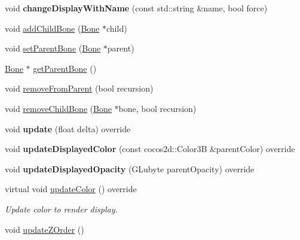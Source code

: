 \begin{DoxyCompactItemize}
void {\bfseries change\+Display\+With\+Name} (const std\+::string \&name, bool force)
\item 
void \hyperlink{classcocostudio_1_1Bone_a0e2a59584601241d1f0cfbe5c3e240ca}{add\+Child\+Bone} (\hyperlink{classcocostudio_1_1Bone}{Bone} $\ast$child)
\item 
void \hyperlink{classcocostudio_1_1Bone_ac68dd00133f611910e2ceb5bc19a1618}{set\+Parent\+Bone} (\hyperlink{classcocostudio_1_1Bone}{Bone} $\ast$parent)
\item 
\hyperlink{classcocostudio_1_1Bone}{Bone} $\ast$ \hyperlink{classcocostudio_1_1Bone_a75f3f3020b33a7d1b105752c3d29dff2}{get\+Parent\+Bone} ()
\item 
void \hyperlink{classcocostudio_1_1Bone_a2421050fc95af899b04e69ef7d276404}{remove\+From\+Parent} (bool recursion)
\item 
void \hyperlink{classcocostudio_1_1Bone_a59fa87941ea1aedd616e6b36ca7a5a25}{remove\+Child\+Bone} (\hyperlink{classcocostudio_1_1Bone}{Bone} $\ast$bone, bool recursion)
\item 
\mbox{\label{classcocostudio_1_1Bone_a4c0132c6deee3de0e80b40fd7088a2c8}} 
void {\bfseries update} (float delta) override
\item 
\mbox{\label{classcocostudio_1_1Bone_a1e52dd16f8619ba33fba2c8e1a470a88}} 
void {\bfseries update\+Displayed\+Color} (const cocos2d\+::\+Color3B \&parent\+Color) override
\item 
\mbox{\label{classcocostudio_1_1Bone_a5354c795b957990240a750c9f252ab38}} 
void {\bfseries update\+Displayed\+Opacity} (G\+Lubyte parent\+Opacity) override
\item 
\mbox{\label{classcocostudio_1_1Bone_a9d86c4504025362acc6657110a2ef490}} 
virtual void \hyperlink{classcocostudio_1_1Bone_a9d86c4504025362acc6657110a2ef490}{update\+Color} () override
\begin{DoxyCompactList}\small\item\em Update color to render display. \end{DoxyCompactList}\item 
\mbox{\label{classcocostudio_1_1Bone_a49ca34fd1f032b8aca8106bd71754a6c}} 
void \hyperlink{classcocostudio_1_1Bone_a49ca34fd1f032b8aca8106bd71754a6c}{update\+Z\+Order} ()

\end{DoxyCompactItemize}

